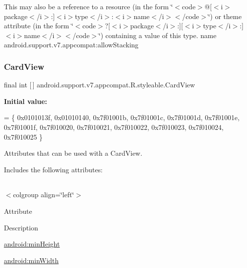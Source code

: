 This may also be a reference to a resource (in the form \char`\"{}$<$code$>$@\mbox{[}$<$i$>$package$<$/i$>$\+:\mbox{]}$<$i$>$type$<$/i$>$\+:$<$i$>$name$<$/i$>$$<$/code$>$\char`\"{}) or theme attribute (in the form \char`\"{}$<$code$>$?\mbox{[}$<$i$>$package$<$/i$>$\+:\mbox{]}\mbox{[}$<$i$>$type$<$/i$>$\+:\mbox{]}$<$i$>$name$<$/i$>$$<$/code$>$\char`\"{}) containing a value of this type.  name android.\+support.\+v7.\+appcompat\+:allow\+Stacking \mbox{\label{classandroid_1_1support_1_1v7_1_1appcompat_1_1R_1_1styleable_aee2dd81febffbeeaeff51a35af0f87ec}} 
\subsubsection{\texorpdfstring{Card\+View}{CardView}}
{\footnotesize\ttfamily final int \mbox{[}$\,$\mbox{]} android.\+support.\+v7.\+appcompat.\+R.\+styleable.\+Card\+View\hspace{0.3cm}{\ttfamily [static]}}

{\bfseries Initial value\+:}
\begin{DoxyCode}
= \{
            0x0101013f, 0x01010140, 0x7f01001b, 0x7f01001c,
            0x7f01001d, 0x7f01001e, 0x7f01001f, 0x7f010020,
            0x7f010021, 0x7f010022, 0x7f010023, 0x7f010024,
            0x7f010025
        \}
\end{DoxyCode}
Attributes that can be used with a Card\+View. 

Includes the following attributes\+:

\tabulinesep=1mm
\begin{longtabu} spread 0pt [c]{*{0}{|X[-1]}|}
\hline
\end{longtabu}
$<$colgroup align=\char`\"{}left\char`\"{}$>$ 

Attribute

Description 

{\ttfamily \hyperlink{classandroid_1_1support_1_1v7_1_1appcompat_1_1R_1_1styleable_acbe23eef77b0ab688155935b67bf9ba8}{android\+:min\+Height}}

{\ttfamily \hyperlink{classandroid_1_1support_1_1v7_1_1appcompat_1_1R_1_1styleable_a4475e3438710b97d8efe5f8c93b698eb}{android\+:min\+Width}}

